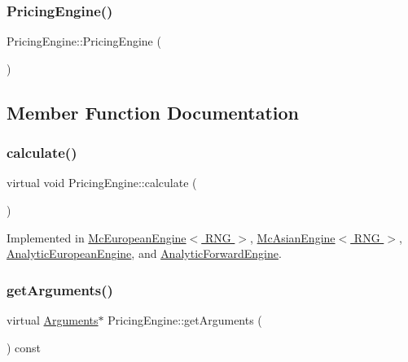 \subsubsection{\texorpdfstring{Pricing\+Engine()}{PricingEngine()}}
{\footnotesize\ttfamily Pricing\+Engine\+::\+Pricing\+Engine (\begin{DoxyParamCaption}{ }\end{DoxyParamCaption})\hspace{0.3cm}{\ttfamily [inline]}}



\subsection{Member Function Documentation}
\hypertarget{class_pricing_engine_a733511ffc3cf5e4dc1fbc2a39208d8bd}{}\label{class_pricing_engine_a733511ffc3cf5e4dc1fbc2a39208d8bd} 
\subsubsection{\texorpdfstring{calculate()}{calculate()}}
{\footnotesize\ttfamily virtual void Pricing\+Engine\+::calculate (\begin{DoxyParamCaption}{ }\end{DoxyParamCaption})\hspace{0.3cm}{\ttfamily [pure virtual]}}



Implemented in \hyperlink{class_mc_european_engine_a6c29ef7a7ba6cd1a2f93ee63070cf40e}{Mc\+European\+Engine$<$ R\+N\+G $>$}, \hyperlink{class_mc_asian_engine_ac16f4259846f55dc6c02d0b628f34e63}{Mc\+Asian\+Engine$<$ R\+N\+G $>$}, \hyperlink{class_analytic_european_engine_adeda22c7b482779d7deaa17037195487}{Analytic\+European\+Engine}, and \hyperlink{class_analytic_forward_engine_a12d6791a13bf727d43ffcff9cb55b094}{Analytic\+Forward\+Engine}.

\hypertarget{class_pricing_engine_a399f4519f58b2ac1d108ce14d0058c97}{}\label{class_pricing_engine_a399f4519f58b2ac1d108ce14d0058c97} 
\subsubsection{\texorpdfstring{get\+Arguments()}{getArguments()}}
{\footnotesize\ttfamily virtual \hyperlink{class_pricing_engine_1_1_arguments}{Arguments}$\ast$ Pricing\+Engine\+::get\+Arguments (\begin{DoxyParamCaption}{ }\end{DoxyParamCaption}) const\hspace{0.3cm}{\ttfamily [pure virtual]}}



